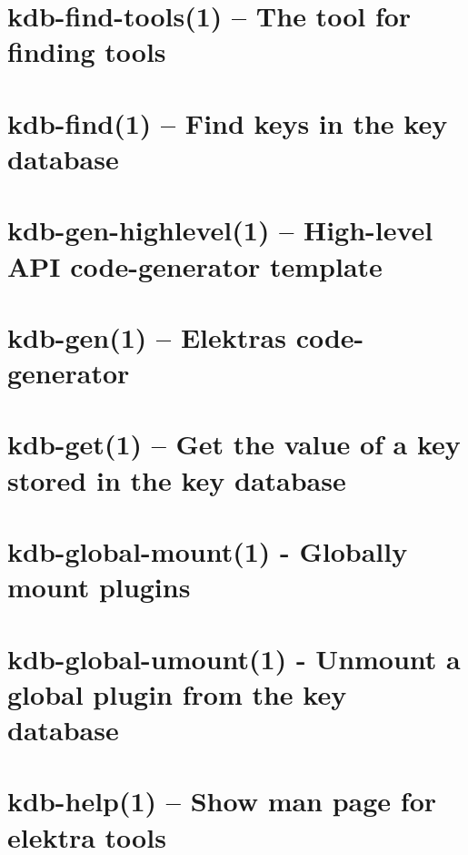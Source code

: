 \let\mypdfximage\pdfximage\def\pdfximage{\immediate\mypdfximage}\documentclass[twoside]{book}
\newcommand{\+}{\discretionary{\mbox{\scriptsize$\hookleftarrow$}}{}{}}
\begin{document}
\chapter{kdb-\/find-\/tools(1) -- The tool for finding tools}
\label{doc_help_kdb-find-tools_md}

\chapter{kdb-\/find(1) -- Find keys in the key database}
\label{doc_help_kdb-find_md}

\chapter{kdb-\/gen-\/highlevel(1) -- High-\/level API code-\/generator template}
\label{doc_help_kdb-gen-highlevel_md}

\chapter{kdb-\/gen(1) -- Elektra\textquotesingle{}s code-\/generator}
\label{doc_help_kdb-gen_md}

\chapter{kdb-\/get(1) -- Get the value of a key stored in the key database}
\label{doc_help_kdb-get_md}

\chapter{kdb-\/global-\/mount(1) -\/ Globally mount plugins}
\label{doc_help_kdb-global-mount_md}

\chapter{kdb-\/global-\/umount(1) -\/ Unmount a global plugin from the key database}
\label{doc_help_kdb-global-umount_md}

\chapter{kdb-\/help(1) -- Show man page for elektra tools}
\label{doc_help_kdb-help_md}

\end{document}
